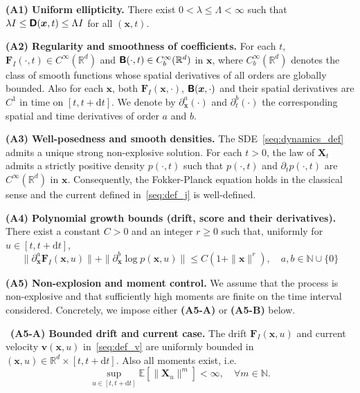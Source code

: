 \medskip
\hypertarget{assumption:A1}{}
\noindent\textbf{(A1) Uniform ellipticity.} There exist $0<\lambda\leq\Lambda<\infty$ such that $\lambda I\leq\boldsymbol{\mathsf{D}}(\bm{x},t)\leq\Lambda I$ for all $(\bm{x},t)$.

\bigskip
\hypertarget{assumption:A2}{}
\noindent\textbf{(A2) Regularity and smoothness of coefficients.}
For each $t$, $\bm{F}_I(\cdot,t)\in C^\infty(\mathbb{R}^d)$ and
$\boldsymbol{\mathsf{B}}(\cdot,t)\in C_b^\infty(\mathbb{R}^d)$ in $\bm{x}$, where $C_b^\infty(\mathbb{R}^d)$ denotes the class of smooth functions
whose spatial derivatives of all orders are globally bounded. Also for each $\bm x$, both $\bm F_I(\bm x,\cdot)$, $\boldsymbol{\mathsf{B}}(\bm x,\cdot)$ and their spatial derivatives are $C^1$ in time on $[t,t+\mathrm dt]$.
We denote by $\partial_{\bm{x}}^a (\cdot)$
and $\partial_{t}^b(\cdot)$ the corresponding spatial and time derivatives of order $a$ and $b$.


\bigskip
\hypertarget{assumption:A3}{}
\noindent\textbf{(A3) Well-posedness and smooth densities.}
The SDE~\eqref{seq:dynamics_def} admits 
a unique strong non-explosive solution. For each $t>0$, the law of $\bm{X}_t$ admits a strictly positive density $p(\cdot,t)$ such that $p(\cdot,t)$ and $\partial_t p(\cdot, t)$ are $C^\infty(\mathbb{R}^d)$ in $\bm x$. Consequently, the Fokker-Planck equation holds in the classical sense and the current defined in~\eqref{seq:def_j} is well-defined.

\bigskip
\hypertarget{assumption:A4}{}
\noindent\textbf{(A4) Polynomial growth bounds (drift, score and their derivatives).} There exist a constant $C>0$ and an integer $r\geq0$ such that, uniformly for $u\in[t,t+\mathrm{d}t]$,
\begin{equation*}
    \|\partial_{\bm{x}}^a \bm{F}_I(\bm{x},u)\|
    +\|\partial_{\bm x}^b \log p(\bm x,u)\|
    \leq
    C(1+\| \bm{x}\|^r),
    \quad
    a,b\in\mathbb N\cup\{0\}
\end{equation*}

\hypertarget{assumption:A5}{}
\noindent\textbf{(A5) Non-explosion and moment control.}
We assume that the process is non-explosive and that sufficiently high moments are finite on the time interval considered. Concretely, we impose either \textbf{(A5-A)} or \textbf{(A5-B)} below.

\medskip
\hypertarget{assumption:A5-A}{}
\noindent\textbullet\ \textbf{(A5-A) Bounded drift and current case.}
The drift $\bm F_I(\bm x,u)$ and current velocity $\bm v(\bm x,u)$ in~\eqref{seq:def_v} are uniformly bounded in $(\bm x,u)\in\mathbb R^d\times[t,t+\mathrm dt]$. Also all moments exist, i.e.
\begin{equation*}
    \sup_{u\in[t,t+\mathrm{d}t]}\mathbb{E}\!\left[\|\bm X_u\|^{m}\right]<\infty,
    \quad\forall m\in\mathbb N.
\end{equation*}

